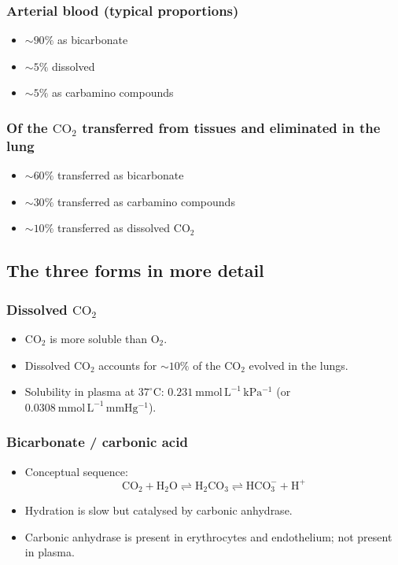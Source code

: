 \documentclass[11pt,a4paper]{article}
\begin{document}
\subsubsection{Arterial blood (typical proportions)}
\begin{itemize}
  \item \(\sim 90\%\) as bicarbonate
  \item \(\sim 5\%\) dissolved
  \item \(\sim 5\%\) as carbamino compounds
\end{itemize}

\subsubsection{Of the \(\mathrm{CO_2}\) transferred from tissues and eliminated in the lung}
\begin{itemize}
  \item \(\sim 60\%\) transferred as bicarbonate
  \item \(\sim 30\%\) transferred as carbamino compounds
  \item \(\sim 10\%\) transferred as dissolved \(\mathrm{CO_2}\)
\end{itemize}

\subsection{The three forms in more detail}
\subsubsection{Dissolved \(\mathrm{CO_2}\)}
\begin{itemize}
  \item \(\mathrm{CO_2}\) is more soluble than \(\mathrm{O_2}\).
  \item Dissolved \(\mathrm{CO_2}\) accounts for \(\sim 10\%\) of the \(\mathrm{CO_2}\) evolved in the lungs.
  \item Solubility in plasma at \(37^\circ\mathrm{C}\): \(0.231~\mathrm{mmol\,L^{-1}\,kPa^{-1}}\) (or \(0.0308~\mathrm{mmol\,L^{-1}\,mmHg^{-1}}\)).
\end{itemize}

\subsubsection{Bicarbonate / carbonic acid}
\begin{itemize}
  \item Conceptual sequence:
  \[
    \mathrm{CO_2 + H_2O \rightleftharpoons H_2CO_3 \rightleftharpoons HCO_3^- + H^+}
  \]
  \item Hydration is slow but catalysed by carbonic anhydrase.
  \item Carbonic anhydrase is present in erythrocytes and endothelium; not present in plasma.
\end{itemize}
\end{document}
